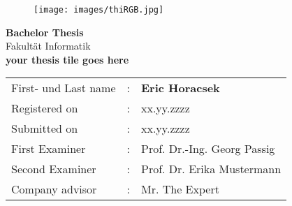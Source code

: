 

\begin{titlepage}	
		\begin{figure}[!h]
			\centering
			\texttt{[image: images/thiRGB.jpg]}	
		\end{figure}																			
	
	\begin{center}
		\hrulefill 
	\end{center}
	
	
	\begin{center}	
		\vspace{1cm}
		
		\huge\textbf{
			Bachelor Thesis}\\[2.5em]
		\normalsize
			Fakultät Informatik	\\ [7em]
	
		\Large\textbf{your thesis tile goes here}	 \\ 

	\end{center}

	\vfill
	
	
	\begin{tabular}{lll}
		First- und Last name &: & \textbf{Eric Horacsek}	\\ [3em]
		
		Registered on &:	& xx.yy.zzzz	\\ [1em] %
		Submitted on &:	& xx.yy.zzzz	\\ [3em] %
		
		First Examiner &: 	& Prof. Dr.-Ing. Georg Passig	\\ [1em]
		Second Examiner &: 	& Prof. Dr. Erika Mustermann	\\[3em]
		
		Company advisor &:	& Mr. The Expert \\ %
	\end{tabular}
	
\end{titlepage}

\restoregeometry